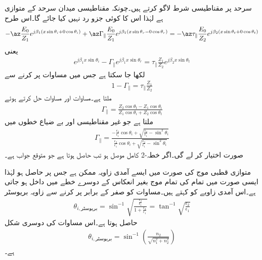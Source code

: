 سرحد پر مقناطیسی شرط لاگو کرتے ہیں۔چونکہ مقناطیسی میدان سرحد کے متوازی ہے لہٰذا اس کا کوئی جزو رد نہیں کیا جائے گا۔اس طرح
\begin{align*}
-\az \frac{E_0}{Z_1} e^{j\beta_1 (x\sin \theta_i +0 \cos \theta_i)}+\az \Gamma_{\parallel} \frac{ E_0}{Z_1} e^{j \beta_1 (x \sin \theta_r-0\cos \theta_r)}=-\az \tau_{\parallel} \frac{E_0}{Z_2} e^{j \beta_2 (x \sin \theta_t+0\cos \theta_t)} 
\end{align*}
یعنی
\begin{align*}
 e^{j\beta_1 x\sin \theta_i}-\Gamma_{\parallel}  e^{j \beta_1 x \sin \theta_r}= \tau_{\parallel} \frac{Z_1}{Z_2} e^{j \beta_2 x \sin \theta_t} 
\end{align*}
لکھا جا سکتا ہے جس میں مساوات  پر کرنے سے
\begin{align}\label{مساوات_ترچھی_متوازی_انعکاسی_انحرافی_تعلق_ب}
1-\Gamma_{\parallel} = \tau_{\parallel} \frac{Z_1}{Z_2} 
\end{align}
ملتا ہے۔مساوات  اور مساوات  حل کرتے ہوئے
\begin{align}\label{مساوات_ترچھی_شرح_انعکاس_متوازی_موج_الف}
\Gamma_{\parallel} =\frac{Z_2 \cos \theta_t -Z_1 \cos \theta_i}{Z_1 \cos \theta_i+Z_2 \cos \theta_t}
\end{align}
ملتا ہے جو غیر مقناطیسی اور بے ضیاع خطوں میں
\begin{align}\label{مساوات_ترچھی_شرح_انعکاس_بلمقابل_زاویہ_آمد}
\Gamma_{\parallel} =\frac{-\frac{\epsilon_2}{\epsilon_1}\cos \theta_i+\sqrt{\frac{\epsilon_2}{\epsilon_1}-\sin^2 \theta_i}}{\frac{\epsilon_2}{\epsilon_1}\cos \theta_i+\sqrt{\frac{\epsilon_2}{\epsilon_1}-\sin^2 \theta_i}}
\end{align}
صورت اختیار کر لے گی۔اگر خطہ-2 کامل موصل ہو تب  حاصل ہوتا ہے جو متوقع جواب ہے۔ 

متوازی قطبی موج کی صورت میں ایسے آمدی زاویہ ممکن ہے جس پر   حاصل ہو لہٰذا ایسی صورت میں تمام کی تمام موج بغیر انعکاس کے دوسرے خطے میں داخل ہو جاتی ہے۔اس آمدی زاویے کو  کہتے ہیں۔مساوات  کو صفر کے برابر پر کرنے سے زاویہ بریوسٹر 
\begin{align}
\theta_{i,\text{بریوسٹر}} =\sin^{-1} \sqrt{\frac{\frac{\epsilon_2}{\epsilon_1}}{1+\frac{\epsilon_2}{\epsilon_1}}}=\tan^{-1} \sqrt{\frac{\epsilon_2}{\epsilon_1}}
\end{align} 
حاصل ہوتا ہے۔اس مساوات کی دوسری شکل
\begin{align}
\theta_{i,\text{بریوسٹر}}= \sin^{-1} \left(\frac{n_2}{\sqrt{n_1^2+n_2^2}}\right)
\end{align}
ہے۔

